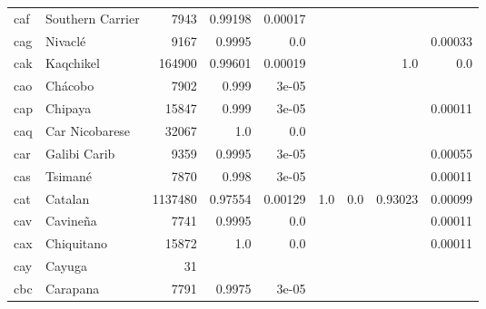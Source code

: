\documentclass[11pt]{article}
\begin{document}
\begin{table*}[h]
{\begin{tabular}{llrrrrrrr}
caf         & Southern Carrier         & 7943         & 0.99198         & 0.00017         &          &          &          &          \\

cag         & Nivaclé         & 9167         & 0.9995         & 0.0         &          &          &          & 0.00033         \\

cak         & Kaqchikel         & 164900         & 0.99601         & 0.00019         &          &          & 1.0         & 0.0         \\

cao         & Chácobo         & 7902         & 0.999         & 3e-05         &          &          &          &          \\

cap         & Chipaya         & 15847         & 0.999         & 3e-05         &          &          &          & 0.00011         \\

caq         & Car Nicobarese         & 32067         & 1.0         & 0.0         &          &          &          &          \\

car         & Galibi Carib         & 9359         & 0.9995         & 3e-05         &          &          &          & 0.00055         \\

cas         & Tsimané         & 7870         & 0.998         & 3e-05         &          &          &          & 0.00011         \\

cat         & Catalan         & 1137480         & 0.97554         & 0.00129         & 1.0         & 0.0         & 0.93023         & 0.00099         \\

cav         & Cavineña         & 7741         & 0.9995         & 0.0         &          &          &          & 0.00011         \\

cax         & Chiquitano         & 15872         & 1.0         & 0.0         &          &          &          & 0.00011         \\

cay         & Cayuga         & 31         &          &          &          &          &          &          \\

cbc         & Carapana         & 7791         & 0.9975         & 3e-05         &          &          &          &          \\


\end{tabular}}
\end{table*}
\end{document}
